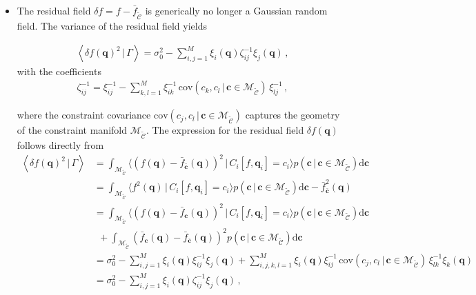 \documentclass[a4paper, 11pt]{article}
\begin{document}
\begin{itemize}
\item
The residual field  $\delta f = f - \bar{f}_{\mathcal{\tilde C}}$ is generically no longer a Gaussian random field. The variance of the residual field yields
\begin{framed}
\begin{align}
\left \langle \delta f (\bm{q})^2\,|\,\Gamma\right\rangle =
\sigma_0^2 - \sum_{i,j=1}^M\xi_i(\bm{q}) \zeta_{ij}^{-1} \xi_j(\bm{q}) 
\,,\label{eq:variance_Nonlinear}
\end{align}
with the coefficients
\begin{align}
\zeta_{ij}^{-1}= \xi_{ij}^{-1}-\sum_{k,l=1}^M\xi_{ik}^{-1}\,\text{cov}(c_k, c_l\,|\,\bm{c}\in\mathcal{M}_\mathcal{\tilde C})\,\xi_{lj}^{-1}\,,
\label{eqn:zetacoeff}
\end{align}
\end{framed}
where the constraint covariance $\text{cov}(c_j, c_l\,|\,\bm{c}\in\mathcal{M}_\mathcal{\tilde C})$ captures the geometry of the constraint manifold $\mathcal{M}_\mathcal{\tilde C}$. The expression for the residual field $\delta f(\bm{q})$ follows directly from
\begin{align}
\left \langle \delta f (\bm{q})^2\,|\,\Gamma\right\rangle 
&= \int_{\mathcal{M}_\mathcal{\tilde C}} \langle (f(\bm{q})-\bar{f}_{\bar{\bm{c}}}(\bm{q}))^2\,|\,C_i[f,\bm{q}_i]=c_i\rangle p(\bm{c}\,|\,\bm{c}\in\mathcal{M}_{\mathcal{\tilde C}})\mathrm{d}\bm{c}\nonumber \\
&= \int_{\mathcal{M}_\mathcal{\tilde C}} \langle f^2(\bm{q})\,|\,C_i[f,\bm{q}_i]=c_i\rangle p(\bm{c}\,|\,\bm{c}\in\mathcal{M}_{\mathcal{\tilde C}})\mathrm{d}\bm{c} - \bar{f}_{\bar{\bm{c}}}^2(\bm{q})\nonumber \\
&= \int_{\mathcal{M}_\mathcal{\tilde C}} \langle (f(\bm{q})-\bar{f}_{\bm{c}}(\bm{q}))^2\,|\,C_i[f,\bm{q}_i]=c_i\rangle p(\bm{c}\,|\,\bm{c}\in\mathcal{M}_{\mathcal{\tilde C}})\mathrm{d}\bm{c} \nonumber \\
&\ \ +\int_{\mathcal{M}_\mathcal{\tilde C}} (\bar{f}_{\bm{c}}(\bm{q})- \bar{f}_{\bar{\bm{c}}}(\bm{q}))^2p(\bm{c}\,|\,\bm{c}\in\mathcal{M}_{\mathcal{\tilde C}})\mathrm{d}\bm{c} \nonumber \\
&=  \sigma_0^2 - \sum_{i,j=1}^M\xi_i(\bm{q}) \xi_{ij}^{-1} \xi_j(\bm{q}) + \sum_{i,j,k,l=1}^M \xi_{i}(\bm{q})\xi_{ij}^{-1}\,\text{cov}(c_j, c_l\,|\,\bm{c}\in\mathcal{M}_\mathcal{\tilde C})\,\xi_{lk}^{-1}\xi_{k}(\bm{q})\nonumber\\
&=
\sigma_0^2 - \sum_{i,j=1}^M\xi_i(\bm{q}) \zeta_{ij}^{-1} \xi_j(\bm{q})\,,
\end{align}

\end{itemize}
\end{document}
